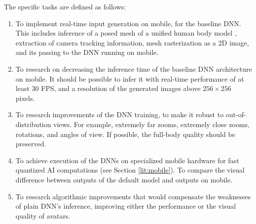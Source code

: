 The specific tasks are defined as follows:
\begin{enumerate}
	\item To implement real-time input generation on mobile, for the baseline DNN. This includes inference of a posed mesh of a unified human body model \cite{dnn:smplx19}, extraction of camera tracking information, mesh rasterization as a 2D image, and its passing to the DNN running on mobile.
	\item To research on decreasing the inference time of the baseline \cite{dnn:stylepeople21} DNN architecture on mobile. It should be possible to infer it with real-time performance of at least 30 FPS, and a resolution of the generated images above $256\times256$ pixels.
	\item To research improvements of the DNN training, to make it robust to out-of-distribution views. For example, extremely far zooms, extremely close zooms, rotations, and angles of view. If possible, the full-body quality should be preserved.
	\item To achieve execution of the DNNs on specialized mobile hardware for fast quantized AI computations (see Section \ref{lit:mobile}). To compare the visual difference between outputs of the default model and outputs on mobile.
	\item To research algorithmic improvements that would compensate the weaknesses of plain DNN's inference, improving either the performance or the visual quality of avatars.

\end{enumerate}

\newpage


